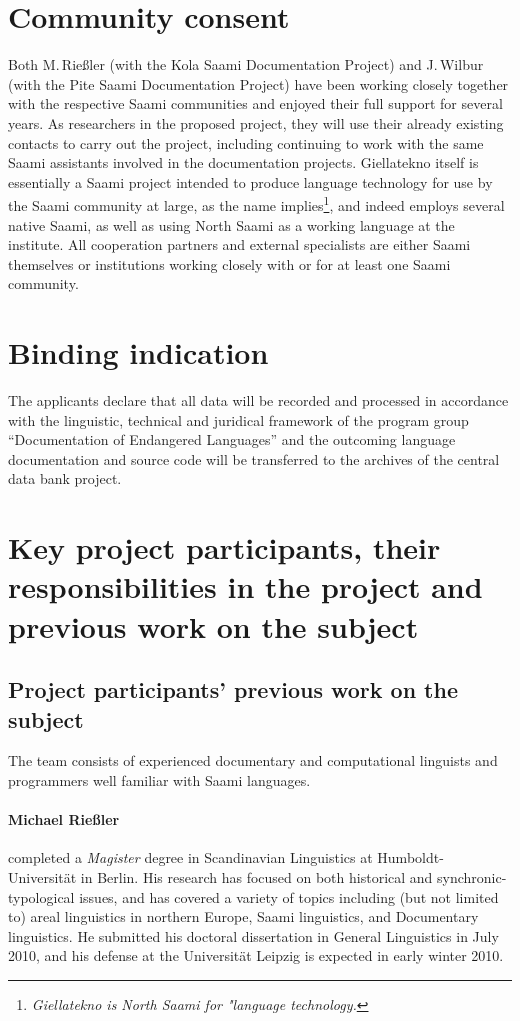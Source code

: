 \documentclass[a4paper,12pt]{article}
\begin{document}
{{\section{Community consent}
Both M.\,Rießler (with the Kola Saami Documentation Project) and J.\,Wilbur (with the Pite Saami Documentation Project) have been working closely together with the respective Saami communities and enjoyed their full support for several years. As researchers in the proposed project, they will use their already existing contacts to carry out the project, including continuing to work with the same Saami assistants involved in the documentation projects. Giellatekno itself is essentially a Saami project intended to produce language technology for use by the Saami community at large, as the name implies\footnote{{\it Giellatekno is North Saami for "language technology.}}, and indeed employs several native Saami, as well as using North Saami as a working language at the institute. All cooperation partners and external specialists are either Saami themselves or institutions working closely with or for at least one Saami community.

\section{Binding indication}

The applicants declare that all data will be recorded and processed in accordance with the linguistic, technical and juridical framework of the program group “Documentation of Endangered Languages” and the outcoming language documentation and source code will be transferred to the archives of the central data bank project.

\section{Key project participants, their responsibilities in the project and previous work on the subject}

\subsection{Project participants' previous work on the subject}
The team consists of experienced documentary and computational linguists and programmers well familiar with Saami languages.

\paragraph{Michael Rießler} completed a \textit{Magister} degree in Scandinavian Linguistics at Humboldt-Universität in Berlin. His research has focused on both historical and synchronic-typological issues, and has covered a variety of topics including (but not limited to) areal linguistics in northern Europe, Saami linguistics, and Documentary linguistics. He submitted his doctoral dissertation in General Linguistics in July 2010, and his defense at the Universität Leipzig is expected in early winter 2010.

}}
\end{document}
